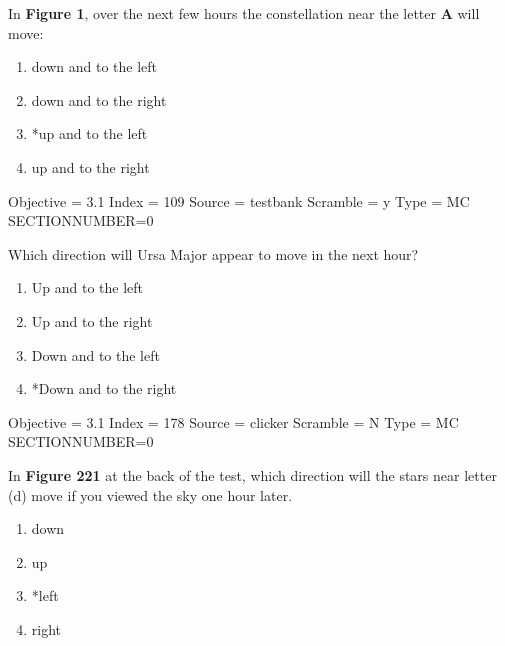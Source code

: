 \documentclass[11pt]{article}
\begin{document}
\begin{enumerate}
\begin{minipage}{\textwidth}
\begin{minipage}{\textwidth}
\item In {\bf Figure 1}, over the next few hours the constellation near the letter {\bf A} will move:
\begin{multicols}{2}
\begin{enumerate} 
\setlength{\itemsep}{1pt} 
\setlength{\parskip}{0pt} 
\setlength{\parsep}{0pt}
\setlength{\multicolsep}{1pt} 
\item down and to the left
\item down and to the right
\item *up and to the left
\item up and to the right
\end{enumerate} 
\vfill 
\end{multicols}

Objective = 3.1
Index = 109
Source = testbank
Scramble = y
Type = MC
SECTIONNUMBER=0
\end{minipage}
\end{minipage}
\vskip 0.20in

\begin{minipage}{\textwidth}
\begin{minipage}{\textwidth}
\item Which direction will Ursa Major appear to move in the next hour?
\begin{multicols}{2}
\begin{enumerate} 
\setlength{\itemsep}{1pt} 
\setlength{\parskip}{0pt} 
\setlength{\parsep}{0pt}
\setlength{\multicolsep}{1pt} 
\item Up and to the left
\item Up and to the right
\item Down and to the left
\item *Down and to the right
\end{enumerate} 
\vfill 
\end{multicols}

Objective = 3.1
Index = 178
Source = clicker
Scramble = N
Type = MC
SECTIONNUMBER=0
\end{minipage}
\end{minipage}
\vskip 0.20in

\begin{minipage}{\textwidth}
\begin{minipage}{3.0in}
\item In {\bf Figure 221} at the back of the test, which direction will the stars near letter (d) move if you viewed the sky one hour later.
\begin{multicols}{2}
\begin{enumerate} 
\setlength{\itemsep}{1pt} 
\setlength{\parskip}{0pt} 
\setlength{\parsep}{0pt}
\setlength{\multicolsep}{1pt} 
\item down
\item up
\item *left
\item right
\end{enumerate} 
\vfill 
\end{multicols}


\end{minipage}
\end{minipage}
\end{enumerate}
\end{document}
